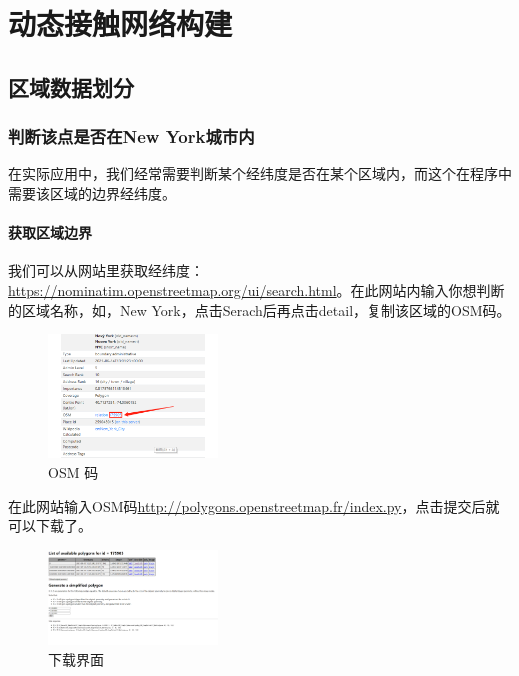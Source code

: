     \chapter{动态接触网络构建}
        \section{区域数据划分}
\subsection{判断该点是否在New York城市内}
在实际应用中，我们经常需要判断某个经纬度是否在某个区域内，而这个在程序中需要该区域的边界经纬度。
\subsubsection{获取区域边界}
我们可以从网站里获取经纬度：\url{https://nominatim.openstreetmap.org/ui/search.html}。在此网站内输入你想判断的区域名称，如，New York，点击Serach后再点击detail，复制该区域的OSM码。
\begin{figure}[H] %
\centering %
\includegraphics[width=0.4\textwidth]{./img/OSM ID.png} %
\caption{OSM 码} %
\label{Fig.OSM} %
\end{figure}

在此网站输入OSM码\url{http://polygons.openstreetmap.fr/index.py}，点击提交后就可以下载了。
\begin{figure}[H] %
\centering %
\includegraphics[width=0.4\textwidth]{./img/download.png} %
\caption{下载界面} %
\label{Fig.download} %
\end{figure}

